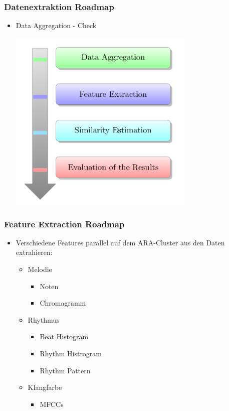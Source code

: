 \documentclass[12pt]{FSUBeamer_official}
\begin{document}
\begin{frame}
	\frametitle{Datenextraktion Roadmap}
	\begin{itemize}
		\item Data Aggregation - Check\\
		\begin{minipage}[b]{0.85\linewidth}
			\centering
			\includegraphics[width=0.7\textwidth]{pics/Org/Tasks.png}	
		\end{minipage}
	\end{itemize}
\end{frame}

\begin{frame}
	\frametitle{Feature Extraction Roadmap}
	\begin{itemize}
		\item Verschiedene Features parallel auf dem ARA-Cluster aus den Daten extrahieren:
			\begin{itemize}
			\item Melodie
			\begin{itemize}
				\item Noten
				\item Chromagramm
			\end{itemize}
			\item Rhythmus
			\begin{itemize}
				\item Beat Histogram 
				\item Rhythm Histrogram 
				\item Rhythm Pattern 
			\end{itemize}
			\item Klangfarbe
			\begin{itemize}
				\item MFCCs
			\end{itemize}
		\end{itemize}
	\end{itemize}
\end{frame}
\end{document}
